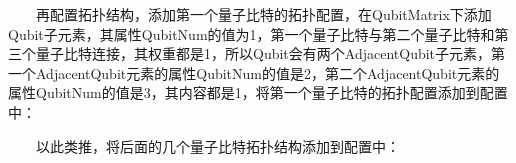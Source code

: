 \documentclass[a4paper,11pt,english]{sphinxmanual}
\begin{document}
\sphinxAtStartPar
  再配置拓扑结构，添加第一个量子比特的拓扑配置，在QubitMatrix下添加Qubit子元素，其属性QubitNum的值为1，第一个量子比特与第二个量子比特和第三个量子比特连接，其权重都是1，所以Qubit会有两个AdjacentQubit子元素，第一个AdjacentQubit元素的属性QubitNum的值是2，第二个AdjacentQubit元素的属性QubitNum的值是3，其内容都是1，将第一个量子比特的拓扑配置添加到配置中：

\begin{sphinxVerbatim}[commandchars=\\\{\}]
    
       
           
           
\end{sphinxVerbatim}

\sphinxAtStartPar
  以此类推，将后面的几个量子比特拓扑结构添加到配置中：
\end{document}
